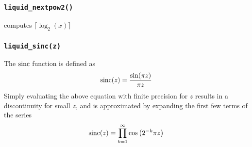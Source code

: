 \subsubsection{{\tt liquid\_nextpow2()}}
\label{module:math:transcendentals:nextpow2}
    computes $\lceil \log_2(x) \rceil$




% 
%
\subsubsection{{\tt liquid\_sinc(z)}}
\label{module:math:transcendentals:sinc}
The $\textup{sinc}$ function is defined as
%
\begin{equation}
\label{eqn:math:sinc}
    \textup{sinc}(z) = \frac{\sin(\pi z)}{\pi z}
\end{equation}
%
Simply evaluating the above equation with finite precision for $z$ results in
a discontinuity for small $z$, and is approximated by expanding the first few
terms of the series
%
\begin{equation}
\label{eqn:math:sinc_expanded}
    \textup{sinc}(z) = \prod_{k=1}^{\infty}{ \cos\left( 2^{-k} \pi z \right) }
\end{equation}

%
%
